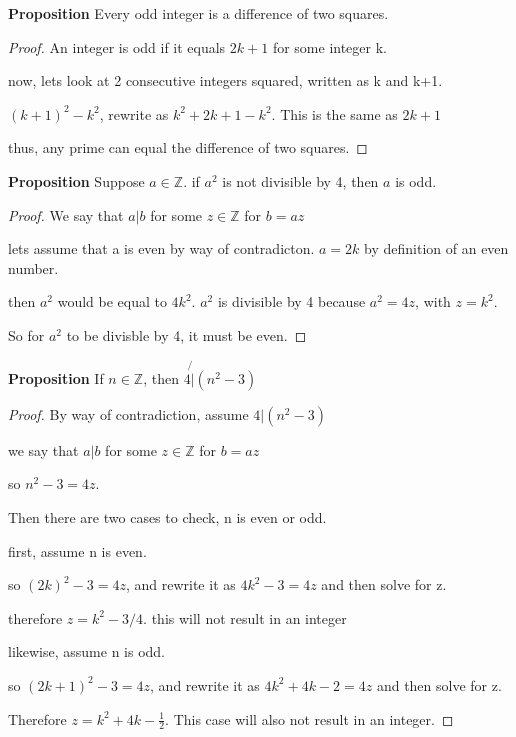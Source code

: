\documentclass[12pt]{article}
\def\Z{\mathbb Z}
\begin{document}
{\bf Proposition} Every odd integer is a difference of two squares.
\begin{proof}
    An integer is odd if it equals $2k+1$ for some integer k.

    now, lets look at 2 consecutive integers squared, written as k and k+1.

    $(k+1)^2 - k^2$, rewrite as $k^2+2k+1-k^2$. This is the same as $2k+1$

    thus, any prime can equal the difference of two squares.

\end{proof}

{\bf Proposition} Suppose $a\in \Z$. if $a^2$ is not divisible by 4, then $a$ is odd.
\begin{proof}

    We say that $a|b$ for some $z\in\Z$ for $b=az$

    lets assume that a is even by way of contradicton. $a=2k$ by definition of an even number.

    then $a^2$ would be equal to $4k^2$. $a^2$ is divisible by 4 because $a^2=4z$, with $z=k^2$.

    So for $a^2$ to be divisble by 4, it must be even.

\end{proof}

{\bf Proposition} If $n\in\Z$, then $4\not{|} (n^2-3)$
\begin{proof}
    By way of contradiction, assume $4|(n^2-3)$
    
    we say that $a|b$ for some $z\in\Z$ for $b=az$

    so $n^2-3=4z$.

    Then there are two cases to check, n is even or odd.

    first, assume n is even.

    so $(2k)^2-3=4z$, and rewrite it as $4k^2-3=4z$ and then solve for z.

    therefore $z=k^2-3/4$. this will not result in an integer

    likewise, assume n is odd.

    so $(2k+1)^2-3=4z$, and rewrite it as $4k^2+4k-2=4z$ and then solve for z.

    Therefore $z=k^2+4k-\frac{1}{2}$. This case will also not result in an integer.

\end{proof}
\end{document}
